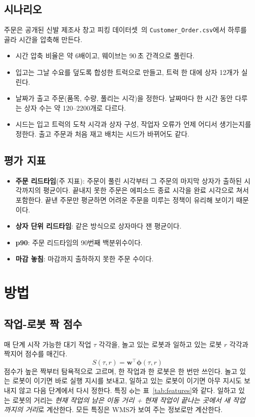 \documentclass[conference]{IEEEtran}
\begin{document}
\subsection{시나리오}
주문은 공개된 신발 제조사 창고 피킹 데이터셋~\cite{assis2023}의 \texttt{Customer\_Order.csv}에서 하루를 골라 시간을 압축해 만든다.
\begin{itemize}
  \item 시간 압축 비율은 약 6배이고, 웨이브는 90\,초 간격으로 풀린다. %
  \item 입고는 그날 수요를 덮도록 합성한 트럭으로 만들고, 트럭 한 대에 상자 12개가 실린다.
  \item 날짜가 출고 주문(품목, 수량, 풀리는 시각)을 정한다. 날짜마다 한 시간 동안 다루는 상자 수는 약 120--2200개로 다르다.
  \item 시드는 입고 트럭의 도착 시각과 상자 구성, 작업자 오류가 언제 어디서 생기는지를 정한다. 출고 주문과 처음 재고 배치는 시드가 바뀌어도 같다.
\end{itemize}

\subsection{평가 지표}
\begin{itemize}
  \item \textbf{주문 리드타임}(주 지표): 주문이 풀린 시각부터 그 주문의 마지막 상자가 출하된 시각까지의 평균이다. 끝내지 못한 주문은 에피소드 종료 시각을 완료 시각으로 쳐서 포함한다. 끝낸 주문만 평균하면 어려운 주문을 미루는 정책이 유리해 보이기 때문이다.
  \item \textbf{상자 단위 리드타임}: 같은 방식으로 상자마다 잰 평균이다.
  \item \textbf{p90}: 주문 리드타임의 90번째 백분위수이다.
  \item \textbf{마감 놓침}: 마감까지 출하하지 못한 주문 수이다.
\end{itemize}

\section{방법}

\subsection{작업-로봇 짝 점수}
매 단계 시작 가능한 대기 작업 $\tau$ 각각을, 놀고 있는 로봇과 일하고 있는 로봇 $r$ 각각과 짝지어 점수를 매긴다.
\begin{equation}
  S(\tau, r) = \mathbf{w}^\top \boldsymbol{\phi}(\tau, r)
\end{equation}
점수가 높은 짝부터 탐욕적으로 고르며, 한 작업과 한 로봇은 한 번만 쓰인다.
놀고 있는 로봇이 이기면 바로 실행 지시를 보내고, 일하고 있는 로봇이 이기면 아무 지시도 보내지 않고 다음 단계에서 다시 정한다.
특징 $\boldsymbol{\phi}$는 표~\ref{tab:features}와 같다.
일하고 있는 로봇의 거리는 \emph{현재 작업의 남은 이동 거리 + 현재 작업이 끝나는 곳에서 새 작업까지의 거리}로 계산한다.
모든 특징은 WMS가 보여 주는 정보로만 계산한다.
\end{document}
